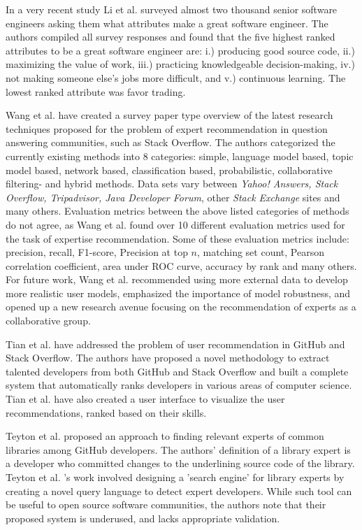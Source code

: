         In a very recent study Li et al. \cite{li2019distinguishes} surveyed almost two thousand senior software engineers asking them what attributes make a great software engineer. The authors compiled all survey responses and found that the five highest ranked attributes to be a great software engineer are: i.) producing good source code, ii.) maximizing the value of work, iii.) practicing knowledgeable decision-making, iv.) not making someone else's jobs more difficult, and v.) continuous learning. The lowest ranked attribute was favor trading.
       
        Wang et al. \cite{wang2018survey} have created a survey paper type overview of the latest research techniques proposed for the problem of expert recommendation in question answering communities, such as Stack Overflow. The authors categorized the currently existing methods into 8 categories: simple, language model based, topic model based, network based, classification based, probabilistic, collaborative filtering- and hybrid methods. Data sets vary between \emph{Yahoo! Answers, Stack Overflow, Tripadvisor, Java Developer Forum}, other \emph{Stack Exchange} sites and many others. Evaluation metrics between the above listed categories of methods do not agree, as Wang et al. found over 10 different evaluation metrics used for the task of expertise recommendation. Some of these evaluation metrics include: precision, recall, F1-score, Precision at top $n$, matching set count, Pearson correlation coefficient, area under ROC curve, accuracy by rank and many others. For future work, Wang et al. recommended using more external data to develop more realistic user models, emphasized the importance of model robustness, and opened up a new research avenue focusing on the recommendation of experts as a collaborative group.
        
        Tian et al. \cite{tian2019geek} have addressed the problem of user recommendation in GitHub and Stack Overflow. The authors have proposed a novel methodology to extract talented developers from both GitHub and Stack Overflow and built a complete system that automatically ranks developers in various areas of computer science. Tian et al. have also created a user interface to visualize the user recommendations, ranked based on their skills.
        
        Teyton et al. \cite{teyton2013find} proposed an approach to finding relevant experts of common libraries among GitHub developers. The authors' definition of a library expert is a developer who committed changes to the underlining source code of the library. Teyton et al. \cite{teyton2013find}'s work involved designing a 'search engine' for library experts by creating a novel query language to detect expert developers. While such tool can be useful to open source software communities, the authors note that their proposed system is underused, and lacks appropriate validation. 
        
